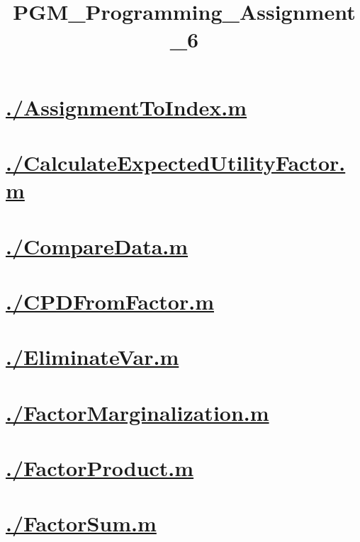 \documentclass{article}
\title{PGM\_Programming\_Assignment\_6}
\begin{document}
\maketitle
\label{toc}
\tableofcontents
\newpage
\section{\hyperref[toc]{./AssignmentToIndex.m}}

\section{\hyperref[toc]{./CalculateExpectedUtilityFactor.m}}

\section{\hyperref[toc]{./CompareData.m}}

\section{\hyperref[toc]{./CPDFromFactor.m}}

\section{\hyperref[toc]{./EliminateVar.m}}

\section{\hyperref[toc]{./FactorMarginalization.m}}

\section{\hyperref[toc]{./FactorProduct.m}}

\section{\hyperref[toc]{./FactorSum.m}}

\end{document}
